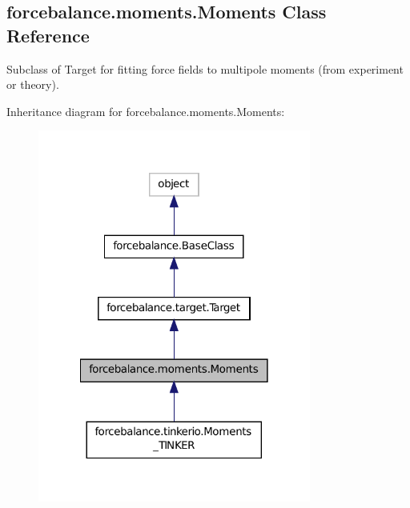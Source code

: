 \hypertarget{classforcebalance_1_1moments_1_1Moments}{\subsection{forcebalance.\-moments.\-Moments Class Reference}
\label{classforcebalance_1_1moments_1_1Moments}
}


Subclass of Target for fitting force fields to multipole moments (from experiment or theory).  




Inheritance diagram for forcebalance.\-moments.\-Moments\-:
\nopagebreak
\begin{figure}[H]
\begin{center}
\leavevmode
\includegraphics[width=254pt]{classforcebalance_1_1moments_1_1Moments__inherit__graph}
\end{center}
\end{figure}


